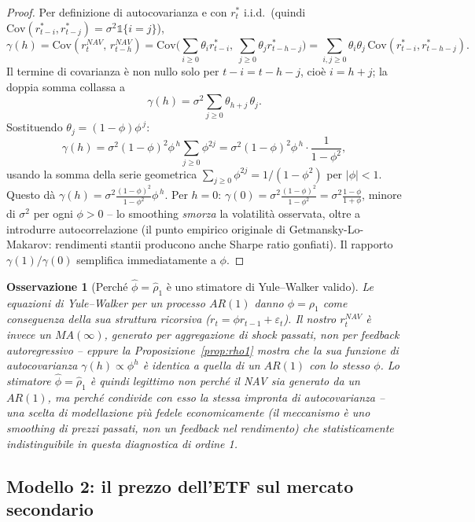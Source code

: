 \documentclass[11pt]{article}
\newtheorem{remark}{Osservazione}
\begin{document}
\begin{proof}
Per definizione di autocovarianza e con $r^\ast_t$ i.i.d.\ (quindi $\mathrm{Cov}(r^\ast_{t-i}, r^\ast_{t-j}) = \sigma^2 \mathbb{1}\{i=j\}$),
\[
\gamma(h) = \mathrm{Cov}(r^{NAV}_t,\, r^{NAV}_{t-h}) = \mathrm{Cov}\Big(\sum_{i\ge 0}\theta_i r^\ast_{t-i},\ \sum_{j\ge 0}\theta_j r^\ast_{t-h-j}\Big) = \sum_{i,j\ge 0}\theta_i\theta_j\,\mathrm{Cov}(r^\ast_{t-i}, r^\ast_{t-h-j}).
\]
Il termine di covarianza \`e non nullo solo per $t-i = t-h-j$, cio\`e $i = h+j$; la doppia somma collassa a
\[
\gamma(h) = \sigma^2 \sum_{j\ge 0} \theta_{h+j}\,\theta_j.
\]
Sostituendo $\theta_j = (1-\phi)\phi^{\,j}$:
\[
\gamma(h) = \sigma^2(1-\phi)^2\phi^{\,h}\sum_{j\ge 0}\phi^{2j} = \sigma^2(1-\phi)^2\phi^{\,h}\cdot\frac{1}{1-\phi^2},
\]
usando la somma della serie geometrica $\sum_{j\ge 0}\phi^{2j} = 1/(1-\phi^2)$ per $|\phi|<1$. Questo d\`a $\gamma(h) = \sigma^2\frac{(1-\phi)^2}{1-\phi^2}\phi^{\,h}$. Per $h=0$: $\gamma(0) = \sigma^2\frac{(1-\phi)^2}{1-\phi^2} = \sigma^2\frac{1-\phi}{1+\phi}$, minore di $\sigma^2$ per ogni $\phi>0$ -- lo smoothing \emph{smorza} la volatilit\`a osservata, oltre a introdurre autocorrelazione (il punto empirico originale di Getmansky-Lo-Makarov: rendimenti stantii producono anche Sharpe ratio gonfiati). Il rapporto $\gamma(1)/\gamma(0)$ semplifica immediatamente a $\phi$.
\end{proof}

\begin{remark}[Perch\'e $\hat\phi = \hat\rho_1$ \`e uno stimatore di Yule--Walker valido]
Le equazioni di Yule--Walker per un processo $AR(1)$ danno $\phi = \rho_1$ come conseguenza della sua struttura ricorsiva ($r_t = \phi r_{t-1} + \varepsilon_t$). Il nostro $r^{NAV}_t$ \`e invece un $MA(\infty)$, generato per aggregazione di shock passati, non per feedback autoregressivo -- eppure la Proposizione~\ref{prop:rho1} mostra che la sua funzione di autocovarianza $\gamma(h)\propto\phi^h$ \`e \emph{identica} a quella di un $AR(1)$ con lo stesso $\phi$. Lo stimatore $\hat\phi=\hat\rho_1$ \`e quindi legittimo non perch\'e il NAV sia generato da un $AR(1)$, ma perch\'e condivide con esso la stessa impronta di autocovarianza -- una scelta di modellazione pi\`u fedele economicamente (il meccanismo \`e uno smoothing di prezzi passati, non un feedback nel rendimento) che statisticamente indistinguibile in questa diagnostica di ordine 1.
\end{remark}

\subsection{Modello 2: il prezzo dell'ETF sul mercato secondario}
\label{sec:model2}
\end{document}
